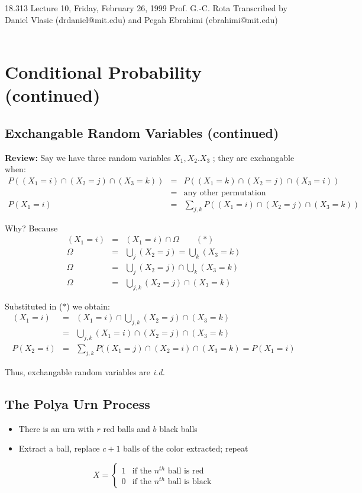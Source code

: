 {\Large 18.313 Lecture 10, Friday, February 26, 1999}\newline
{\large Prof. G.-C. Rota}\newline
Transcribed by Daniel Vlasic (drdaniel@mit.edu) and Pegah Ebrahimi (ebrahimi@mit.edu) \\\\

\section{Conditional Probability (continued)}

\subsection{Exchangable Random Variables (continued)}

{\bf Review:}  Say we have three random variables $X_1, X_2. X_3$ ; they are exchangable when:
\begin{eqnarray*}
P((X_1=i) \cap (X_2=j) \cap (X_3=k)) &=& P((X_1=k) \cap (X_2=j) \cap (X_3=i)) \\
 &=& \mbox{any other permutation}\\
P(X_1=i) &=& \sum_{j,k} P((X_1=i) \cap (X_2=j) \cap (X_3=k)) 
\end{eqnarray*}

Why? Because
\begin{eqnarray*}
(X_1=i) &=& (X_1=i) \cap \Omega \qquad (\ast)\\
\Omega &=& \bigcup_j (X_2=j)= \bigcup_k (X_3=k) \\
\Omega &=& \bigcup_j (X_2=j) \cap \bigcup_k (X_3=k) \\
\Omega &=& \bigcup_{j,k} (X_2=j) \cap(X_3=k)
\end{eqnarray*}

Substituted in ($\ast$) we obtain:
\begin{eqnarray*}
(X_1=i) &=& (X_1=i) \cap \bigcup_{j,k} (X_2=j) \cap (X_3=k) \\
&=& \bigcup_{j,k} (X_1=i) \cap (X_2=j) \cap (X_3=k) \\
P(X_2=i) &=& \sum_{j,k} P((X_1=j) \cap (X_2=i) \cap (X_3=k) = P(X_1=i) 
\end{eqnarray*}

Thus, exchangable random variables are {\it i.d.}

\subsection{The Polya Urn Process}
\begin{itemize}
\item[] There is an urn with $r$ red balls and $b$ black balls
\item Extract a ball, replace $c+1$ balls of the color extracted; repeat
\end{itemize}
\[X = \left\{\begin{array}{ll}
	      1    &\mbox{if the $n^{th}$ ball is red} \\
	      0    &\mbox{if the $n^{th}$ ball is black}
	      \end{array}
	\right. \]	

